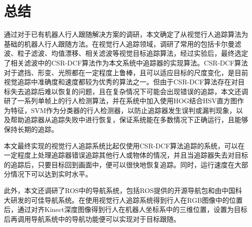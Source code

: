 
\chapter{总结}

  通过对于已有机器人行人跟随解决方案的调研，本文确定了从视觉行人追踪算法为基础的机器人行人跟随方法。在视觉行人追踪领域，调研了常用的包括卡尔曼滤波、粒子滤波、均值漂移、相关滤波等视觉目标追踪算法，经过实验后，最终选定了相关滤波中的CSR-DCF算法作为本文系统中追踪器的实现算法。CSR-DCF算法对于遮挡、形变、光照都在一定程度上鲁棒，且可以适应目标的尺度变化，是目前视觉追踪中准确度和速度都较为优秀的算法之一。但由于CSR-DCF算法存在对目标失去追踪后难以恢复的问题，且在复杂情况下可能会出现错误的追踪，本文还调研了一系列单帧上的行人检测算法，并在系统中加入使用HOG结合HSV直方图作为特征，SVM作为分类器的行人检测器，以防止追踪器发生误判或漏判现象，以及帮助追踪器从追踪失败中进行恢复，保证系统能在多数情况下正确运行，且能够保持长期的追踪。

  本文最终实现的视觉行人追踪系统比起仅使用CSR-DCF算法追踪的系统，可以在一定程度上处理追踪器错误追踪其他行人或物体的情况，并且当追踪器失去对目标的追踪后，只要目标回到画面中，便可以很快地恢复追踪。同时，运行速度在大部分情况下可以达到实时水平。

  此外，本文还调研了ROS中的导航系统，包括ROS提供的开源导航包和由中国科大研发的可佳导航系统。在使用视觉行人追踪系统得到行人在RGB图像中的位置后，通过对齐Kinect深度图像得到行人在机器人坐标系中的三维位置，设置为目标后再调用导航系统中的导航功能便可以实现对于目标跟随。
